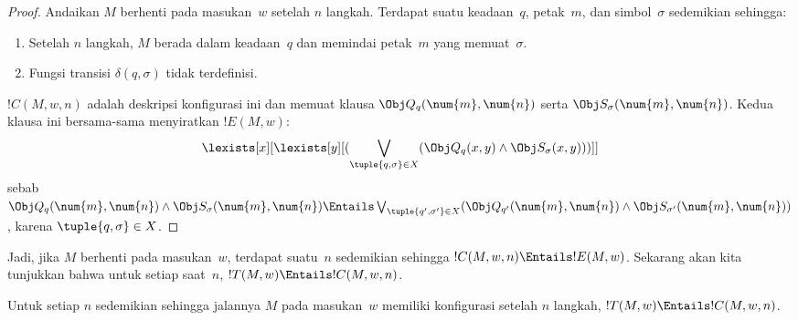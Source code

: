 \documentclass[../../../include/open-logic-section]{subfiles}
\begin{document}
\begin{proof}
Andaikan $M$ berhenti pada masukan~$w$ setelah $n$ langkah. Terdapat suatu
keadaan~$q$, petak~$m$, dan simbol~$\sigma$ sedemikian sehingga:
\begin{enumerate}
\item Setelah $n$ langkah, $M$ berada dalam keadaan~$q$ dan memindai
  petak~$m$ yang memuat~$\sigma$.
\item Fungsi transisi $\delta(q, \sigma)$ tidak terdefinisi.
\end{enumerate}
$!C(M, w, n)$ adalah deskripsi konfigurasi ini dan memuat klausa
$\Obj Q_{q}(\num{m}, \num{n})$ serta
$\Obj S_{\sigma}(\num{m}, \num{n})$. Kedua klausa ini bersama-sama
menyiratkan $!E(M,w)$:
\[
\lexists[x][\lexists[y][(\bigvee_{\tuple{q, \sigma} \in
      X}(\Obj Q_q(x, y) \land \Obj S_\sigma(x, y)))]]
\]
sebab $\Obj Q_q(\num{m}, \num{n}) \land
\Obj S_\sigma(\num{m}, \num{n}) \Entails
\bigvee_{\tuple{q', \sigma'} \in X}
(\Obj Q_{q'}(\num{m}, \num{n}) \land
\Obj S_{\sigma'}(\num{m}, \num{n}))$, karena
$\tuple{q,\sigma} \in X$.
\end{proof}

\begin{explain}
Jadi, jika $M$ berhenti pada masukan~$w$, terdapat suatu~$n$ sedemikian sehingga
$!C(M, w, n) \Entails !E(M,w)$. Sekarang akan kita tunjukkan bahwa untuk
setiap saat~$n$, $!T(M, w) \Entails !C(M, w, n)$.
\end{explain}

\begin{lem}
Untuk setiap $n$ sedemikian sehingga jalannya $M$ pada masukan~$w$ memiliki
konfigurasi setelah $n$ langkah, $!T(M, w) \Entails !C(M, w, n)$.
\end{lem}
\end{document}
